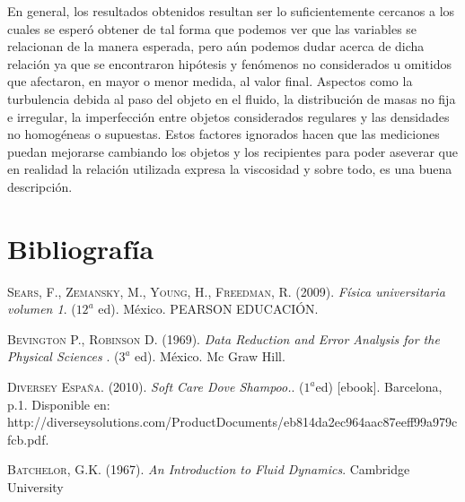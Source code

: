 \documentclass[a4paper]{article}
\begin{document}
En general, los resultados obtenidos resultan ser lo suficientemente cercanos a los cuales se esperó obtener de tal forma que podemos ver que las variables se relacionan de la manera esperada, pero aún podemos dudar acerca de dicha relación ya que se encontraron hipótesis y fenómenos no considerados u omitidos que afectaron, en mayor o menor medida, al valor final. Aspectos como la turbulencia debida al paso del objeto en el fluido, la distribución de masas no fija e irregular, la imperfección entre objetos considerados regulares y las densidades no homogéneas o supuestas. Estos factores ignorados hacen que las mediciones puedan mejorarse cambiando los objetos y los recipientes para poder aseverar que en realidad la relación utilizada expresa la viscosidad y sobre todo, es una buena descripción.









\section*{Bibliografía}
\begin{thebibliography}{a}
 \textsc{Sears, F., Zemansky, M., Young, H., Freedman, R.} (2009). \textit{Física universitaria volumen 1}. ($12^a$ ed). México. PEARSON EDUCACIÓN.

 \textsc{Bevington P., Robinson D.} (1969). \textit{Data Reduction and Error Analysis for the Physical Sciences
}. ($3^a$ ed). México. Mc Graw Hill.


 \textsc{Diversey España.} (2010). \textit{Soft Care Dove Shampoo.}. ($1^a$ed) [ebook]. Barcelona, p.1. Disponible en: http://diverseysolutions.com/ProductDocuments/eb814da2ec964aac87eeff99a979cfcb.pdf.

 \textsc{Batchelor, G.K.} (1967). \textit{An Introduction to Fluid Dynamics}. Cambridge University 

\end{thebibliography}
\end{document}
